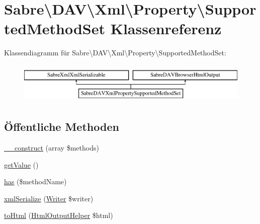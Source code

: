 \hypertarget{class_sabre_1_1_d_a_v_1_1_xml_1_1_property_1_1_supported_method_set}{}\section{Sabre\textbackslash{}D\+AV\textbackslash{}Xml\textbackslash{}Property\textbackslash{}Supported\+Method\+Set Klassenreferenz}
\label{class_sabre_1_1_d_a_v_1_1_xml_1_1_property_1_1_supported_method_set}
Klassendiagramm für Sabre\textbackslash{}D\+AV\textbackslash{}Xml\textbackslash{}Property\textbackslash{}Supported\+Method\+Set\+:\begin{figure}[H]
\begin{center}
\leavevmode
\includegraphics[height=1.964912cm]{class_sabre_1_1_d_a_v_1_1_xml_1_1_property_1_1_supported_method_set}
\end{center}
\end{figure}
\subsection*{Öffentliche Methoden}
\begin{DoxyCompactItemize}
\item 
\mbox{\hyperlink{class_sabre_1_1_d_a_v_1_1_xml_1_1_property_1_1_supported_method_set_a559bbd4ca693edfe3e3a7986e04d2912}{\+\_\+\+\_\+construct}} (array \$methods)
\item 
\mbox{\hyperlink{class_sabre_1_1_d_a_v_1_1_xml_1_1_property_1_1_supported_method_set_af64cedf9514f0e45f2455a7514548c04}{get\+Value}} ()
\item 
\mbox{\hyperlink{class_sabre_1_1_d_a_v_1_1_xml_1_1_property_1_1_supported_method_set_aa07d75f0a223532499f9ac41628565ed}{has}} (\$method\+Name)
\item 
\mbox{\hyperlink{class_sabre_1_1_d_a_v_1_1_xml_1_1_property_1_1_supported_method_set_afcdb94acaf6d8fead3559dd9d181dd83}{xml\+Serialize}} (\mbox{\hyperlink{class_sabre_1_1_xml_1_1_writer}{Writer}} \$writer)
\item 
\mbox{\hyperlink{class_sabre_1_1_d_a_v_1_1_xml_1_1_property_1_1_supported_method_set_afcab0ef1e0a50669a6591f27ae0f75b3}{to\+Html}} (\mbox{\hyperlink{class_sabre_1_1_d_a_v_1_1_browser_1_1_html_output_helper}{Html\+Output\+Helper}} \$html)
\end{DoxyCompactItemize}
